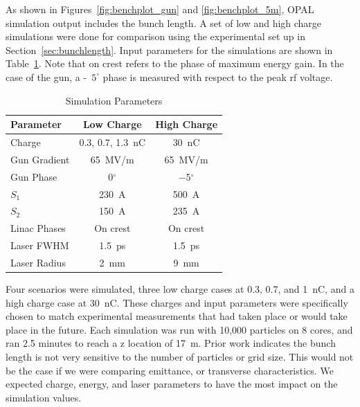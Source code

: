 As shown in Figures~\ref{fig:benchplot_gun} and \ref{fig:benchplot_5m}, 
OPAL simulation output includes the bunch length.
A set of low and high charge simulations were done  
for comparison using the experimental set up in Section~\ref{sec:bunchlength}.
Input parameters for the simulations are shown in Table~\ref{simparam}.
Note that on crest refers to the phase of maximum energy gain.
In the case of the gun, a -~$5^{\circ}$ phase is measured 
with respect to the peak rf voltage.
\begin{table}[hbt]
	\centering
	\caption{Simulation Parameters}
	\begin{tabular}{lcc}
		\toprule
		\toprule
		\textbf{Parameter} & \textbf{Low Charge}  & \textbf{High Charge} \\
		\midrule
		Charge       & 0.3, 0.7, \SI{1.3}{nC}        & \SI{30}{nC}    \\ %
		Gun Gradient & \SI{65}{MV/m}     & \SI{65}{MV/m}  \\ %
		Gun Phase    & \SI{0}{}$^{\circ}$ & \SI{-5}{}$^{\circ}$ \\		 
		$S_1$        & \SI{230}{A}		 & \SI{500}{A}	  \\
		$S_2$		 & \SI{150}{A}   	 & \SI{235}{A}		 \\
		Linac Phases & On crest          & On crest       \\
		Laser FWHM   & \SI{1.5}{ps}      & \SI{1.5}{ps}   \\ %
		Laser Radius & \SI{2}{mm}        & \SI{9}{mm}     \\
		\bottomrule
	\end{tabular}
	\label{simparam}
\end{table}

Four scenarios were simulated, three low charge cases at 0.3, 0.7, and \SI{1}{nC}, and a 
high charge case at \SI{30}{nC}. 
These charges and input parameters were specifically chosen to 
match experimental measurements that had taken place or would 
take place in the future. Each simulation was run with 10,000 particles 
on 8 cores, and ran 2.5 minutes to reach a z location of \SI{17}{m}.
Prior work \cite{benchmark} indicates the bunch length is not 
very sensitive to the number of particles or grid size. 
This would not be the case if we were comparing emittance, or 
transverse characteristics. We expected charge, energy,
and laser parameters to have the most impact on the simulation values.


